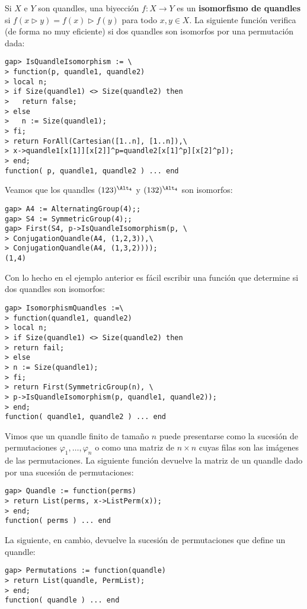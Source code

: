 \begin{block}
	Si $X$ e $Y$ son quandles, una biyección $f\colon X\to Y$ es un
	\textbf{isomorfismo de quandles} si $f(x\triangleright
	y)=f(x)\triangleright f(y)$ para todo $x,y\in X$. La siguiente función
	verifica (de forma no muy eficiente) si dos quandles son isomorfos por una
	permutación dada:
\begin{lstlisting}
gap> IsQuandleIsomorphism := \
> function(p, quandle1, quandle2)
> local n;
> if Size(quandle1) <> Size(quandle2) then
>   return false;
> else
>   n := Size(quandle1);
> fi;
> return ForAll(Cartesian([1..n], [1..n]),\
> x->quandle1[x[1]][x[2]]^p=quandle2[x[1]^p][x[2]^p]);
> end;
function( p, quandle1, quandle2 ) ... end
\end{lstlisting}
\end{block}

\begin{example}
Veamos que los quandles $(123)^{\Alt_4}$ y $(132)^{\Alt_4}$ son
isomorfos: 
\begin{lstlisting}
gap> A4 := AlternatingGroup(4);;
gap> S4 := SymmetricGroup(4);;
gap> First(S4, p->IsQuandleIsomorphism(p, \
> ConjugationQuandle(A4, (1,2,3)),\
> ConjugationQuandle(A4, (1,3,2))));
(1,4)
\end{lstlisting}
\end{example}

\begin{block}
Con lo hecho en el ejemplo anterior es fácil escribir una función que determine
si dos quandles son isomorfos:
\begin{lstlisting}
gap> IsomorphismQuandles :=\
> function(quandle1, quandle2)
> local n;
> if Size(quandle1) <> Size(quandle2) then
> return fail;
> else
> n := Size(quandle1);
> fi;
> return First(SymmetricGroup(n), \
> p->IsQuandleIsomorphism(p, quandle1, quandle2));
> end;
function( quandle1, quandle2 ) ... end
\end{lstlisting}
\end{block}

\begin{block}
Vimos que un quandle finito de tamaño $n$ puede presentarse como la sucesión de
permutaciones $\varphi_1,\dots,\varphi_n$ o como una matriz de $n\times n$
cuyas filas son las imágenes de las permutaciones. La siguiente función devuelve
la matriz de un quandle dado por una sucesión de permutaciones:
\begin{lstlisting}
gap> Quandle := function(perms)
> return List(perms, x->ListPerm(x));
> end;
function( perms ) ... end
\end{lstlisting}
La siguiente, en cambio, devuelve la sucesión de permutaciones que define un
quandle:
\begin{lstlisting}
gap> Permutations := function(quandle)
> return List(quandle, PermList);
> end;
function( quandle ) ... end
\end{lstlisting}
\end{block}

